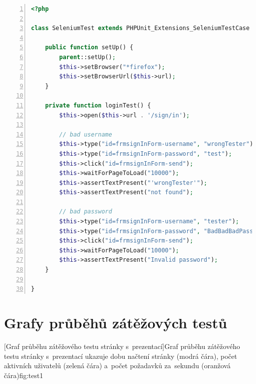 \documentclass[11pt,twoside,a4paper]{book}
\begin{document}
\begin{lstlisting}[caption={Ukázka Selenium testu},label={lst:seleniumtest},
language=php,
numbers=left,
breaklines=true]
<?php

class SeleniumTest extends PHPUnit_Extensions_SeleniumTestCase {

	public function setUp() {
		parent::setUp();
		$this->setBrowser("*firefox");
		$this->setBrowserUrl($this->url);
	}

	private function loginTest() {
		$this->open($this->url . '/sign/in');

		// bad username
		$this->type("id=frmsignInForm-username", "wrongTester");
		$this->type("id=frmsignInForm-password", "test");
		$this->click("id=frmsignInForm-send");
		$this->waitForPageToLoad("10000");
		$this->assertTextPresent("'wrongTester'");
		$this->assertTextPresent("not found");

		// bad password
		$this->type("id=frmsignInForm-username", "tester");
		$this->type("id=frmsignInForm-password", "BadBadBadPassword");
		$this->click("id=frmsignInForm-send");
		$this->waitForPageToLoad("10000");
		$this->assertTextPresent("Invalid password");
	}
	
}
\end{lstlisting}

\chapter{Grafy průběhů zátěžových testů}\label{chap:loadtest}

%
[Graf průběhu zátěžového testu stránky s~prezentací]{Graf průběhu zátěžového testu stránky s~prezentací ukazuje dobu načtení stránky (modrá čára), počet aktivních uživatelů (zelená čára) a~počet požadavků za~sekundu (oranžová čára)}{fig:test1}
\end{document}
